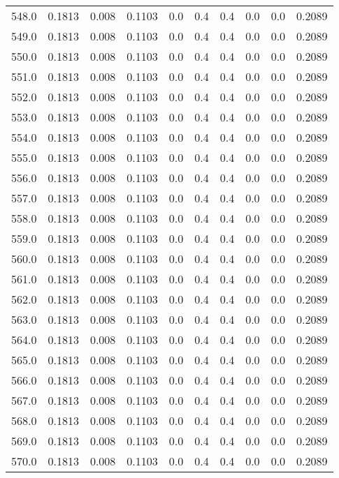 \begin{longtable}{lrrrrrrrrr}
548.0 & 0.1813 & 0.008 & 0.1103 & 0.0 & 0.4 & 0.4 & 0.0 & 0.0 & 0.2089 \\
549.0 & 0.1813 & 0.008 & 0.1103 & 0.0 & 0.4 & 0.4 & 0.0 & 0.0 & 0.2089 \\
550.0 & 0.1813 & 0.008 & 0.1103 & 0.0 & 0.4 & 0.4 & 0.0 & 0.0 & 0.2089 \\
551.0 & 0.1813 & 0.008 & 0.1103 & 0.0 & 0.4 & 0.4 & 0.0 & 0.0 & 0.2089 \\
552.0 & 0.1813 & 0.008 & 0.1103 & 0.0 & 0.4 & 0.4 & 0.0 & 0.0 & 0.2089 \\
553.0 & 0.1813 & 0.008 & 0.1103 & 0.0 & 0.4 & 0.4 & 0.0 & 0.0 & 0.2089 \\
554.0 & 0.1813 & 0.008 & 0.1103 & 0.0 & 0.4 & 0.4 & 0.0 & 0.0 & 0.2089 \\
555.0 & 0.1813 & 0.008 & 0.1103 & 0.0 & 0.4 & 0.4 & 0.0 & 0.0 & 0.2089 \\
556.0 & 0.1813 & 0.008 & 0.1103 & 0.0 & 0.4 & 0.4 & 0.0 & 0.0 & 0.2089 \\
557.0 & 0.1813 & 0.008 & 0.1103 & 0.0 & 0.4 & 0.4 & 0.0 & 0.0 & 0.2089 \\
558.0 & 0.1813 & 0.008 & 0.1103 & 0.0 & 0.4 & 0.4 & 0.0 & 0.0 & 0.2089 \\
559.0 & 0.1813 & 0.008 & 0.1103 & 0.0 & 0.4 & 0.4 & 0.0 & 0.0 & 0.2089 \\
560.0 & 0.1813 & 0.008 & 0.1103 & 0.0 & 0.4 & 0.4 & 0.0 & 0.0 & 0.2089 \\
561.0 & 0.1813 & 0.008 & 0.1103 & 0.0 & 0.4 & 0.4 & 0.0 & 0.0 & 0.2089 \\
562.0 & 0.1813 & 0.008 & 0.1103 & 0.0 & 0.4 & 0.4 & 0.0 & 0.0 & 0.2089 \\
563.0 & 0.1813 & 0.008 & 0.1103 & 0.0 & 0.4 & 0.4 & 0.0 & 0.0 & 0.2089 \\
564.0 & 0.1813 & 0.008 & 0.1103 & 0.0 & 0.4 & 0.4 & 0.0 & 0.0 & 0.2089 \\
565.0 & 0.1813 & 0.008 & 0.1103 & 0.0 & 0.4 & 0.4 & 0.0 & 0.0 & 0.2089 \\
566.0 & 0.1813 & 0.008 & 0.1103 & 0.0 & 0.4 & 0.4 & 0.0 & 0.0 & 0.2089 \\
567.0 & 0.1813 & 0.008 & 0.1103 & 0.0 & 0.4 & 0.4 & 0.0 & 0.0 & 0.2089 \\
568.0 & 0.1813 & 0.008 & 0.1103 & 0.0 & 0.4 & 0.4 & 0.0 & 0.0 & 0.2089 \\
569.0 & 0.1813 & 0.008 & 0.1103 & 0.0 & 0.4 & 0.4 & 0.0 & 0.0 & 0.2089 \\
570.0 & 0.1813 & 0.008 & 0.1103 & 0.0 & 0.4 & 0.4 & 0.0 & 0.0 & 0.2089 \\

\end{longtable}
